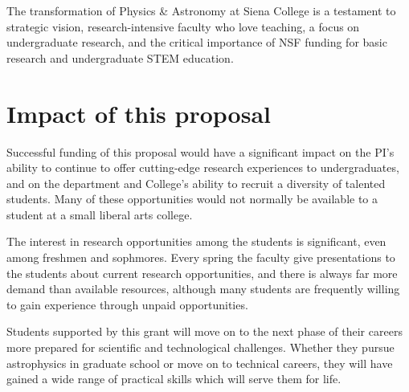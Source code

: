 \documentclass[12pt, preprint]{aastex}
\begin{document}
The transformation of Physics \& Astronomy at Siena College is a testament to strategic vision, research-intensive 
faculty who love teaching, a focus on undergraduate research, and the critical
importance of NSF funding for basic research and undergraduate STEM education. 

\section{Impact of this proposal}

Successful funding of this proposal would have a significant impact on the PI's
ability to continue to offer cutting-edge research experiences to
undergraduates, and on the department and College's ability to recruit a
diversity of talented students.  Many of these opportunities would not normally
be available to a student at a small liberal arts college.

The interest in research opportunities among the students is significant, even
among freshmen and sophmores.  Every spring the faculty give presentations to
the students about current research opportunities, and there is always far more
demand than available resources, although many students are frequently willing
to gain experience through unpaid opportunities.

Students supported by this grant will move on to the next phase of their careers
more prepared for scientific and technological challenges.  Whether they pursue
astrophysics in graduate school or move on to technical careers, they will have
gained a wide range of practical skills which will serve them for life.
				

\end{document}
